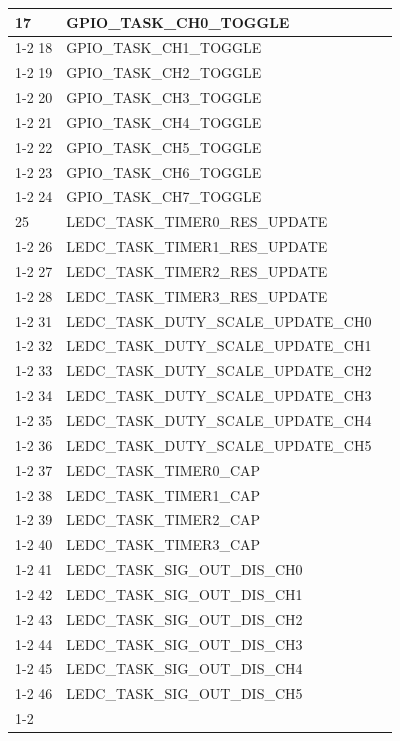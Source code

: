 \documentclass[main\_\_EN.tex]{subfiles}
\begin{document}
\begin{longtable}{ | l | l | l | }
17  & GPIO\_TASK\_CH0\_TOGGLE  &  \\ \cline{1-2}
18  & GPIO\_TASK\_CH1\_TOGGLE  &  \\ \cline{1-2}
19  & GPIO\_TASK\_CH2\_TOGGLE  &  \\ \cline{1-2}
20  & GPIO\_TASK\_CH3\_TOGGLE  &  \\ \cline{1-2}
21  & GPIO\_TASK\_CH4\_TOGGLE  &  \\ \cline{1-2}
22  & GPIO\_TASK\_CH5\_TOGGLE  &  \\ \cline{1-2}
23  & GPIO\_TASK\_CH6\_TOGGLE  &  \\ \cline{1-2}
24  & GPIO\_TASK\_CH7\_TOGGLE  &  \\ \hline
25  & LEDC\_TASK\_TIMER0\_RES\_UPDATE      & \nameref{mod:ledpwm} \\ \cline{1-2}
26  & LEDC\_TASK\_TIMER1\_RES\_UPDATE      & \\ \cline{1-2}
27  & LEDC\_TASK\_TIMER2\_RES\_UPDATE      & \\ \cline{1-2}
28  & LEDC\_TASK\_TIMER3\_RES\_UPDATE      & \\ \cline{1-2}
31  & LEDC\_TASK\_DUTY\_SCALE\_UPDATE\_CH0 & \\ \cline{1-2}
32  & LEDC\_TASK\_DUTY\_SCALE\_UPDATE\_CH1 & \\ \cline{1-2}
33  & LEDC\_TASK\_DUTY\_SCALE\_UPDATE\_CH2 & \\ \cline{1-2}
34  & LEDC\_TASK\_DUTY\_SCALE\_UPDATE\_CH3 & \\ \cline{1-2}
35  & LEDC\_TASK\_DUTY\_SCALE\_UPDATE\_CH4 & \\ \cline{1-2}
36  & LEDC\_TASK\_DUTY\_SCALE\_UPDATE\_CH5 & \\ \cline{1-2}
37  & LEDC\_TASK\_TIMER0\_CAP  & \\ \cline{1-2}
38  & LEDC\_TASK\_TIMER1\_CAP  & \\ \cline{1-2}
39  & LEDC\_TASK\_TIMER2\_CAP  & \\ \cline{1-2}
40  & LEDC\_TASK\_TIMER3\_CAP  & \\ \cline{1-2}
41  & LEDC\_TASK\_SIG\_OUT\_DIS\_CH0& \\ \cline{1-2}
42  & LEDC\_TASK\_SIG\_OUT\_DIS\_CH1& \\ \cline{1-2}
43  & LEDC\_TASK\_SIG\_OUT\_DIS\_CH2& \\ \cline{1-2}
44  & LEDC\_TASK\_SIG\_OUT\_DIS\_CH3& \\ \cline{1-2}
45  & LEDC\_TASK\_SIG\_OUT\_DIS\_CH4& \\ \cline{1-2}
46  & LEDC\_TASK\_SIG\_OUT\_DIS\_CH5& \\ \cline{1-2}

\end{longtable}
\end{document}
